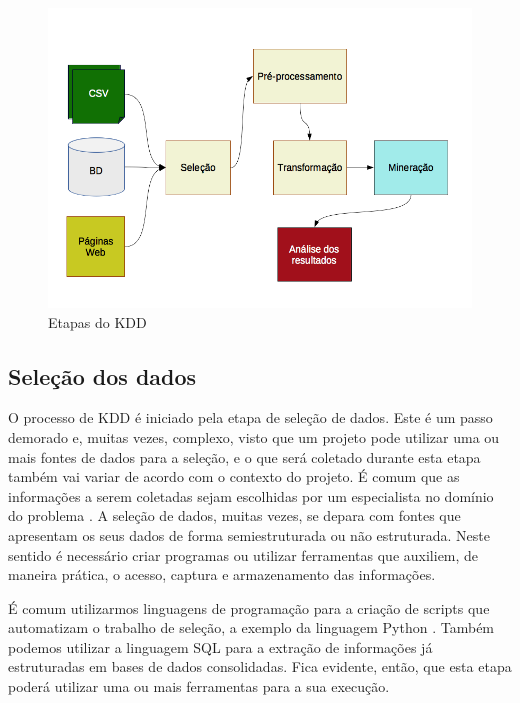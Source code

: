 \begin{figure}[htb]
  \caption{\label{fig:kdd}Etapas do KDD}
  \begin{center}
    \includegraphics[scale=0.8]{imagens/kdd.png}
  \end{center}
\end{figure}
\newpage

\subsection{Seleção dos dados}

O processo de KDD é iniciado pela etapa de seleção de dados. Este é um passo demorado e, muitas vezes, complexo, visto que um projeto pode utilizar uma ou mais fontes de dados para a seleção, e o que será coletado durante esta etapa também vai variar de acordo com o contexto do projeto. É comum que as informações a serem coletadas sejam escolhidas por um especialista no domínio do problema \cite{Boente2008}. A seleção de dados, muitas vezes, se depara com fontes que apresentam os seus dados de forma semiestruturada ou não estruturada. Neste sentido é necessário criar programas ou utilizar ferramentas que auxiliem, de maneira prática, o acesso, captura e armazenamento das informações.

É comum utilizarmos linguagens de programação para a criação de scripts que automatizam o trabalho de seleção, a exemplo da linguagem Python \cite{python2018, Smedt2012}. Também podemos utilizar a linguagem SQL para a extração de informações já estruturadas em bases de dados consolidadas. Fica evidente, então, que esta etapa poderá utilizar uma ou mais ferramentas para a sua execução.

